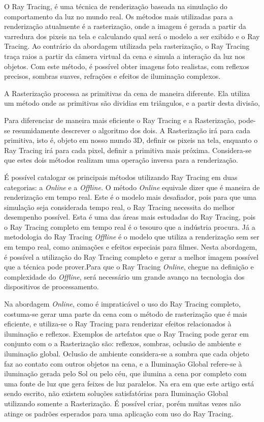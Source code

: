 \documentclass[journal]{IEEEtran}
\begin{document}
O Ray Tracing, é uma técnica de renderização baseada na simulação do comportamento
da luz no mundo real. Os métodos mais utilizadas para a renderização atualmente
é a rasterização, onde a imagem é gerada a partir da varredura dos pixeis na
tela e calculando qual será o modelo a ser exibido e o Ray Tracing. Ao contrário da
abordagem utilizada pela rasterização, o Ray Tracing traça raios a partir da
câmera virtual da cena e simula a interação da luz nos objetos. Com este método,
é possível obter imagens foto realistas, com reflexos precisos, sombras suaves,
refrações e efeitos de iluminação complexos. 

A Rasterização processa as primitivas da cena de maneira diferente. Ela
utiliza um método onde as primitivas são dividias em triângulos, e a partir desta
divisão, 

Para diferenciar de maneira mais eficiente o Ray Tracing e a Rasterização, pode-se
resumidamente descrever o algoritmo dos dois. A Rasterização irá  para cada
primitiva, isto é, objeto em nosso mundo 3D, definir os pixeis na tela, enquanto
o Ray Tracing irá para cada pixel, definir a primitiva mais próxima. Considera-se
que estes dois métodos realizam uma operação inversa para a renderização.
\cite{c11}

É possível catalogar os principais métodos utilizando Ray Tracing em duas categorias: 
a \emph{Online} e a \emph{Offline.} O método \emph{Online} equivale dizer que é
maneira de renderização em tempo real. Este é o modelo mais desafiador, pois para
que uma simulação seja considerada tempo real, o Ray Tracing necessita do melhor
desempenho possível. Esta é uma das áreas mais estudadas do Ray Tracing, pois 
o Ray Tracing completo em tempo real é o tesouro que a indústria procura. Já a
metodologia do Ray Tracing \emph{Offline} é o modelo que utiliza a renderização
sem ser em tempo real, como animações e efeitos especiais para filmes. Nesta
abordagem, é possível a utilização do Ray Tracing completo e gerar a melhor imagem
possível que a técnica pode prover.Para que o  Ray Tracing \emph{Online}, chegue na
definição e complexidade do \emph{Offline}, será necessário um grande avanço na 
tecnologia dos dispositivos de processamento.
\cite{c11}

Na abordagem \emph{Online}, como é impraticável o uso do Ray Tracing completo, costuma-se
gerar uma parte da cena com o método de rasterização que é mais eficiente, e utiliza-se
o Ray Tracing para renderizar efeitos relacionados à iluminação e reflexos. Exemplos
de artefatos que o Ray Tracing pode gerar em conjunto com o a Rasterização são:
reflexos, sombras, oclusão de ambiente e iluminação global. Oclusão de ambiente
considera-se a sombra que cada objeto faz ao contato com outros objetos na cena,
e a Iluminação Global refere-se à iluminação gerada pelo Sol ou pelo céu, que
ilumina a cena por completo com uma fonte de luz que gera feixes de luz paralelos.
Na era em que este artigo está sendo escrito, não existem soluções satisfatórias
para Iluminação Global utilizando somente a Rasterização. É possível criar, porém
muitas vezes não atinge os padrões esperados para uma aplicação com uso do 
Ray Tracing.
\end{document}
